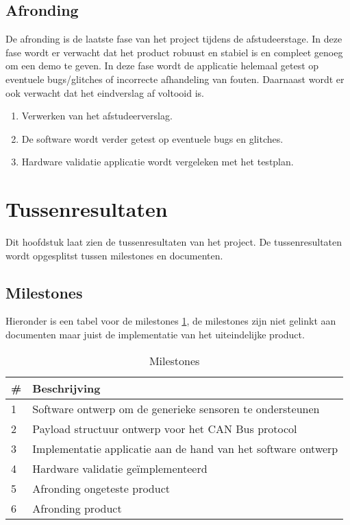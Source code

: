 \newpage
\subsection{Afronding}
De afronding is de laatste fase van het project tijdens de afstudeerstage. In deze fase wordt er verwacht dat het product robuust en stabiel is en compleet genoeg om een demo te geven. In deze fase wordt de applicatie helemaal getest op eventuele bugs/glitches of incorrecte afhandeling van fouten. Daarnaast wordt er ook verwacht dat het eindverslag af voltooid is.
\begin{enumerate}
	\item Verwerken van het afstudeerverslag.
	\item De software wordt verder getest op eventuele bugs en glitches.
	\item Hardware validatie applicatie wordt vergeleken met het testplan.
\end{enumerate}


\section{Tussenresultaten}
Dit hoofdstuk laat zien de tussenresultaten van het project. De tussenresultaten wordt opgesplitst tussen milestones en documenten.

\subsection{Milestones}
Hieronder is een tabel voor de milestones \ref{tab:milestones}, de milestones zijn niet gelinkt aan documenten maar juist de implementatie van het uiteindelijke product.
\begin{table}[h!]
		\caption{Milestones}
		\begin{tabular}{p{1cm}p{14cm}}
		\toprule
		\textbf{\#} & \textbf{Beschrijving} \\ \midrule
		1 & Software ontwerp om de generieke sensoren te ondersteunen      \\
		2 & Payload structuur ontwerp voor het CAN Bus protocol      \\
		3 & Implementatie applicatie aan de hand van het software ontwerp					\\
		4 & Hardware validatie geïmplementeerd		\\
		5 & Afronding ongeteste product \\
		6 & Afronding product              \\ \bottomrule
		\end{tabular}

	\label{tab:milestones}
\end{table}

